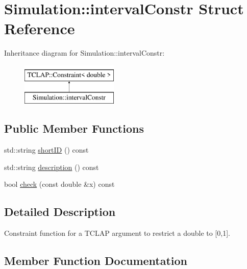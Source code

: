 \hypertarget{structSimulation_1_1intervalConstr}{}\section{Simulation\+:\+:interval\+Constr Struct Reference}
\label{structSimulation_1_1intervalConstr}
Inheritance diagram for Simulation\+:\+:interval\+Constr\+:\begin{figure}[H]
\begin{center}
\leavevmode
\includegraphics[height=2.000000cm]{structSimulation_1_1intervalConstr}
\end{center}
\end{figure}
\subsection*{Public Member Functions}
\begin{DoxyCompactItemize}
\item 
std\+::string \hyperlink{structSimulation_1_1intervalConstr_a100c7d32a4c1e571e15bbc7463fee2b2}{short\+ID} () const
\item 
std\+::string \hyperlink{structSimulation_1_1intervalConstr_acd0d4140e524a5017441f3d10ca9d3bf}{description} () const
\item 
bool \hyperlink{structSimulation_1_1intervalConstr_a7c2cbda337f9d4ef3a626019120a2316}{check} (const double \&x) const
\end{DoxyCompactItemize}


\subsection{Detailed Description}
Constraint function for a T\+C\+L\+AP argument to restrict a double to \mbox{[}0,1\mbox{]}. 

\subsection{Member Function Documentation}
\mbox{\label{structSimulation_1_1intervalConstr_a7c2cbda337f9d4ef3a626019120a2316}} 
